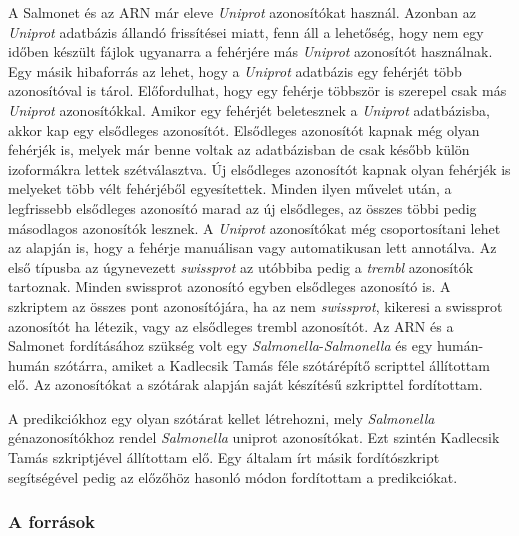 \documentclass[a4paper,12pt]{article}
\begin{document}
			A Salmonet és az ARN már eleve \textit{Uniprot} azonosítókat használ. Azonban az \textit{Uniprot} adatbázis állandó frissítései miatt, fenn áll a lehetőség, hogy nem egy időben készült fájlok ugyanarra a fehérjére más \textit{Uniprot} azonosítót használnak. Egy másik hibaforrás az lehet, hogy a \textit{Uniprot} adatbázis egy fehérjét több azonosítóval is tárol. Előfordulhat, hogy egy fehérje többször is szerepel csak más \textit{Uniprot} azonosítókkal. Amikor egy fehérjét beletesznek a \textit{Uniprot} adatbázisba, akkor kap egy elsődleges azonosítót. Elsődleges azonosítót kapnak még olyan fehérjék is, melyek már benne voltak az adatbázisban de csak később külön izoformákra lettek szétválasztva. Új elsődleges azonosítót kapnak olyan fehérjék is melyeket több vélt fehérjéből egyesítettek. Minden ilyen művelet után, a legfrissebb elsődleges azonosító marad az új elsődleges, az összes többi pedig másodlagos azonosítók lesznek. A \textit{Uniprot} azonosítókat még csoportosítani lehet az alapján is, hogy a fehérje manuálisan vagy automatikusan lett annotálva. Az első típusba az úgynevezett \textit{swissprot} az utóbbiba pedig a \textit{trembl} azonosítók tartoznak. Minden swissprot azonosító egyben elsődleges azonosító is. A szkriptem az összes pont azonosítójára, ha az nem \textit{swissprot}, kikeresi a swissprot azonosítót ha létezik, vagy az elsődleges trembl azonosítót. Az ARN és a Salmonet fordításához szükség volt egy \textit{Salmonella}-\textit{Salmonella} és egy humán-humán szótárra, amiket a Kadlecsik Tamás féle szótárépítő scripttel állítottam elő. Az azonosítókat a szótárak alapján saját készítésű szkripttel fordítottam.
			
			A predikciókhoz egy olyan szótárat kellet létrehozni, mely \textit{Salmonella} génazonosítókhoz rendel \textit{Salmonella} uniprot azonosítókat. Ezt szintén Kadlecsik Tamás szkriptjével állítottam elő. Egy általam írt másik fordítószkript segítségével pedig az előzőhöz hasonló módon fordítottam a predikciókat.
			
			
		\subsubsection{A források}
\end{document}

